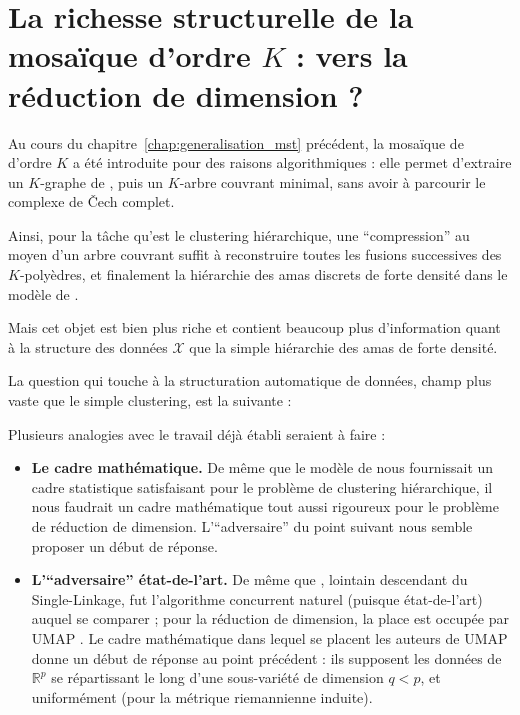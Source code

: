 


\section{La richesse structurelle de la mosaïque d'ordre $K$ : vers la réduction de dimension ?}
\label{sec:chapV_reduction_dimension}

Au cours du chapitre~\ref{chap:generalisation_mst} précédent, la mosaïque de  d'ordre $K$ a été introduite pour des raisons algorithmiques : elle permet d'extraire un $K$-graphe de , puis un $K$-arbre couvrant minimal, sans avoir à parcourir le complexe de \v Cech complet. 

Ainsi, pour la tâche qu'est le clustering hiérarchique, une ``compression'' au moyen d'un arbre couvrant suffit à reconstruire toutes les fusions successives des $K$-polyèdres, et finalement la hiérarchie des amas discrets de forte densité \KNN dans le modèle de .

Mais cet objet est bien plus riche et contient beaucoup plus d'information quant à la structure des données $\mathcal X$ que la simple hiérarchie des amas de forte densité.

La question qui touche à la structuration automatique de données, champ plus vaste que le simple clustering, est la suivante :


Plusieurs analogies avec le travail déjà établi seraient à faire :
\begin{itemize}
    \item \textbf{Le cadre mathématique.} De même que le modèle de  nous fournissait un cadre statistique satisfaisant pour le problème de clustering hiérarchique, il nous faudrait un cadre mathématique tout aussi rigoureux pour le problème de réduction de dimension. L'``adversaire'' du point suivant nous semble proposer un début de réponse.
    \item \textbf{L'``adversaire'' état-de-l'art.} De même que \HDBSCAN, lointain descendant du Single-Linkage, fut l'algorithme concurrent naturel (puisque état-de-l'art) auquel se comparer ; pour la réduction de dimension, la place est occupée par UMAP \cite{Umap}. Le cadre mathématique dans lequel se placent les auteurs de UMAP donne un début de réponse au point précédent : ils supposent les données de $\mathbb R^p$ se répartissant le long d'une sous-variété de dimension $q < p$, et uniformément (pour la métrique riemannienne induite).
\end{itemize}



